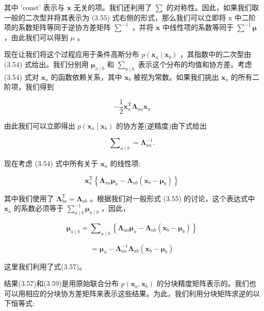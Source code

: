 \documentclass[10pt]{report}
\begin{document}
其中 'const' 表示与 \(\mathbf{x}\) 无关的项。我们还利用了 \(\sum\) 的对称性。因此，如果我们取一般的二次型并将其表示为 (3.55) 式右侧的形式，那么我们可以立即将 \(\mathrm{x}\) 中二阶项的系数矩阵等同于逆协方差矩阵 \({\mathbf{\sum }}^{-1}\) ，并将 \(\mathbf{x}\) 中线性项的系数等同于 \({\mathbf{\sum }}^{-1}\mathbf{\mu }\) ，由此我们可以得到 \(\mu\) 。

现在让我们将这个过程应用于条件高斯分布 \(p\left( {{\mathbf{x}}_{a} \mid  {\mathbf{x}}_{b}}\right)\) ，其指数中的二次型由 (3.54) 式给出。我们分别用 \({\mathbf{\mu }}_{a \mid  b}\) 和 \({\mathbf{\sum }}_{a \mid  b}\) 表示这个分布的均值和协方差。考虑 (3.54) 式对 \({\mathbf{x}}_{a}\) 的函数依赖关系，其中 \({\mathbf{x}}_{b}\) 被视为常数。如果我们挑出 \({\mathbf{x}}_{a}\) 的所有二阶项，我们得到

\[
- \frac{1}{2}{\mathbf{x}}_{a}^{\mathrm{T}}{\mathbf{\Lambda }}_{aa}{\mathbf{x}}_{a} \tag{3.56}
\]

由此我们可以立即得出 \(p\left( {{\mathbf{x}}_{a} \mid  {\mathbf{x}}_{b}}\right)\) 的协方差(逆精度)由下式给出

\[
{\mathbf{\sum }}_{a \mid  b} = {\mathbf{\Lambda }}_{aa}^{-1}. \tag{3.57}
\]

现在考虑 (3.54) 式中所有关于 \({\mathbf{x}}_{a}\) 的线性项:

\[
{\mathbf{x}}_{a}^{\mathrm{T}}\left\{  {{\mathbf{\Lambda }}_{aa}{\mathbf{\mu }}_{a} - {\mathbf{\Lambda }}_{ab}\left( {{\mathbf{x}}_{b} - {\mathbf{\mu }}_{b}}\right) }\right\}   \tag{3.58}
\]

其中我们使用了 \({\mathbf{\Lambda }}_{ba}^{\mathrm{T}} = {\mathbf{\Lambda }}_{ab}\) 。根据我们对一般形式 (3.55) 的讨论，这个表达式中 \({\mathbf{x}}_{a}\) 的系数必须等于 \({\mathbf{\sum }}_{a \mid  b}^{-1}{\mathbf{\mu }}_{a \mid  b}\) ，因此，

\[
{\mathbf{\mu }}_{a \mid  b} = {\mathbf{\sum }}_{a \mid  b}\left\{  {{\mathbf{\Lambda }}_{aa}{\mathbf{\mu }}_{a} - {\mathbf{\Lambda }}_{ab}\left( {{\mathbf{x}}_{b} - {\mathbf{\mu }}_{b}}\right) }\right\}
\]

\[
= {\mathbf{\mu }}_{a} - {\mathbf{\Lambda }}_{aa}^{-1}{\mathbf{\Lambda }}_{ab}\left( {{\mathbf{x}}_{b} - {\mathbf{\mu }}_{b}}\right)  \tag{3.59}
\]

这里我们利用了式(3.57)。

结果(3.57)和(3.59)是用原始联合分布 \(p\left( {{\mathbf{x}}_{a},{\mathbf{x}}_{b}}\right)\) 的分块精度矩阵表示的。我们也可以用相应的分块协方差矩阵来表示这些结果。为此，我们利用分块矩阵求逆的以下恒等式:
\end{document}
